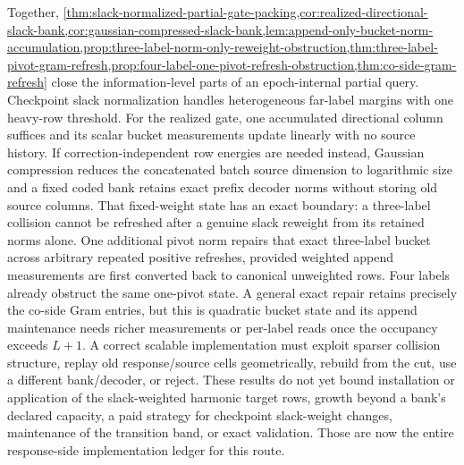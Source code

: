 Together,
\cref{thm:slack-normalized-partial-gate-packing,cor:realized-directional-slack-bank,cor:gaussian-compressed-slack-bank,lem:append-only-bucket-norm-accumulation,prop:three-label-norm-only-reweight-obstruction,thm:three-label-pivot-gram-refresh,prop:four-label-one-pivot-refresh-obstruction,thm:co-side-gram-refresh}
close the information-level parts of an epoch-internal partial query.
Checkpoint slack normalization handles heterogeneous far-label margins with
one heavy-row threshold.  For the realized gate, one accumulated directional
column suffices and its scalar bucket measurements update linearly with no
source history.  If correction-independent row energies are needed instead,
Gaussian compression reduces the concatenated batch source dimension to
logarithmic size and a fixed coded bank retains exact prefix decoder norms
without storing old source columns.  That fixed-weight state has an exact
boundary: a three-label collision cannot be refreshed after a genuine slack
reweight from its retained norms alone.  One additional pivot norm repairs
that exact three-label bucket across arbitrary repeated positive refreshes,
provided weighted append measurements are first converted back to canonical
unweighted rows.  Four labels already obstruct the same one-pivot state.  A
general exact repair retains precisely the co-side Gram entries, but this is
quadratic bucket state and its append maintenance needs richer measurements
or per-label reads once the occupancy exceeds $L+1$.  A correct scalable
implementation must exploit sparser collision structure, replay old
response/source cells geometrically, rebuild from the cut, use a different
bank/decoder, or reject.  These results do not yet
bound installation or application of the slack-weighted harmonic target rows,
growth beyond a bank's declared capacity, a paid strategy for checkpoint
slack-weight changes, maintenance of the transition band, or exact
validation.  Those are now the entire response-side implementation ledger for
this route.
